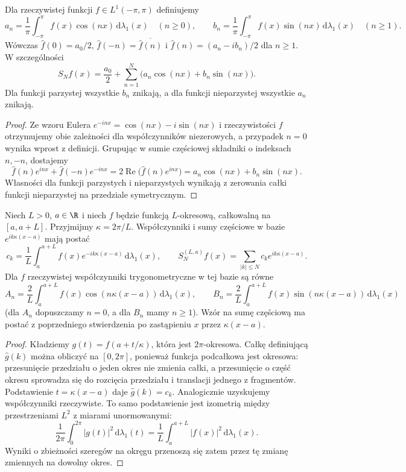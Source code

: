 \begin{stwierdzenie}
\label{prop:dt-series-real}
Dla rzeczywistej funkcji $f\in L^1(-\pi,\pi)$ definiujemy
\[
 a_n=\frac1\pi\int_{-\pi}^{\pi}f(x)\cos(nx)\,
 \mathrm d\lambda_1(x)\quad(n\ge0),\qquad
 b_n=\frac1\pi\int_{-\pi}^{\pi}f(x)\sin(nx)\,
 \mathrm d\lambda_1(x)\quad(n\ge1).
\]
Wówczas $\widehat f(0)=a_0/2$,
$\widehat f(-n)=\overline{\widehat f(n)}$ i
$\widehat f(n)=(a_n-ib_n)/2$ dla $n\ge1$. W szczególności
\[
 S_Nf(x)=\frac{a_0}{2}+
 \sum_{n=1}^N\bigl(a_n\cos(nx)+b_n\sin(nx)\bigr).
\]
Dla funkcji parzystej wszystkie $b_n$ znikają,
a dla funkcji nieparzystej wszystkie $a_n$ znikają.
\end{stwierdzenie}
\begin{proof}
Ze wzoru Eulera $e^{-inx}=\cos(nx)-i\sin(nx)$
i rzeczywistości $f$ otrzymujemy obie zależności
dla współczynników niezerowych, a przypadek $n=0$
wynika wprost z definicji. Grupując w sumie częściowej
składniki o indeksach $n,-n$, dostajemy
\[
 \widehat f(n)e^{inx}+\widehat f(-n)e^{-inx}
 =2\operatorname{Re}\bigl(\widehat f(n)e^{inx}\bigr)
 =a_n\cos(nx)+b_n\sin(nx).
\]
Własności dla funkcji parzystych i nieparzystych
wynikają z zerowania całki funkcji nieparzystej
na przedziale symetrycznym.
\end{proof}

\begin{stwierdzenie}
\label{prop:dt-series-period}
Niech $L>0$, $a\in\R$ i niech $f$ będzie funkcją
$L$-okresową, całkowalną na $[a,a+L]$.
Przyjmijmy $\kappa=2\pi/L$. Współczynniki i sumy
częściowe w bazie $e^{ik\kappa(x-a)}$ mają postać
\[
 c_k=\frac1L\int_a^{a+L}f(x)e^{-ik\kappa(x-a)}
 \,\mathrm d\lambda_1(x),\qquad
 S_N^{(L,a)}f(x)=\sum_{|k|\le N}c_k e^{ik\kappa(x-a)}.
\]
Dla $f$ rzeczywistej współczynniki trygonometryczne
w tej bazie są równe
\[
 A_n=\frac2L\int_a^{a+L}f(x)\cos(n\kappa(x-a))
 \,\mathrm d\lambda_1(x),\qquad
 B_n=\frac2L\int_a^{a+L}f(x)\sin(n\kappa(x-a))
 \,\mathrm d\lambda_1(x)
\]
(dla $A_n$ dopuszczamy $n=0$, a dla $B_n$ mamy $n\ge1$).
Wzór na sumę częściową ma postać z poprzedniego
stwierdzenia po zastąpieniu $x$ przez $\kappa(x-a)$.
\end{stwierdzenie}
\begin{proof}
Kładziemy $g(t)=f(a+t/\kappa)$, która jest
$2\pi$-okresowa. Całkę definiującą $\widehat g(k)$
można obliczyć na $[0,2\pi]$, ponieważ funkcja
podcałkowa jest okresowa: przesunięcie przedziału
o jeden okres nie zmienia całki, a przesunięcie
o część okresu sprowadza się do rozcięcia przedziału
i translacji jednego z fragmentów. Podstawienie
$t=\kappa(x-a)$ daje $\widehat g(k)=c_k$.
Analogicznie uzyskujemy współczynniki rzeczywiste.
To samo podstawienie jest izometrią między
przestrzeniami $L^2$ z miarami unormowanymi:
\[
 \frac1{2\pi}\int_0^{2\pi}|g(t)|^2\,\mathrm d\lambda_1(t)
 =\frac1L\int_a^{a+L}|f(x)|^2\,\mathrm d\lambda_1(x).
\]
Wyniki o zbieżności szeregów na okręgu przenoszą
się zatem przez tę zmianę zmiennych na dowolny okres.
\end{proof}

